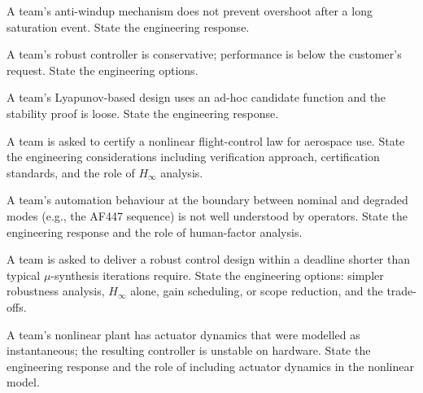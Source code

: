 \begin{exercise}
A team's anti-windup mechanism does not prevent overshoot after a long saturation event. State the engineering response.
\end{exercise}

\begin{exercise}
A team's robust controller is conservative; performance is below the customer's request. State the engineering options.
\end{exercise}

\begin{exercise}
A team's Lyapunov-based design uses an ad-hoc candidate function and the stability proof is loose. State the engineering response.
\end{exercise}

\begin{exercise}
A team is asked to certify a nonlinear flight-control law for aerospace use. State the engineering considerations including verification approach, certification standards, and the role of $H_\infty$ analysis.
\end{exercise}

\begin{exercise}
A team's automation behaviour at the boundary between nominal and degraded modes (e.g., the AF447 sequence) is not well understood by operators. State the engineering response and the role of human-factor analysis.
\end{exercise}

\begin{exercise}
A team is asked to deliver a robust control design within a deadline shorter than typical $\mu$-synthesis iterations require. State the engineering options: simpler robustness analysis, $H_\infty$ alone, gain scheduling, or scope reduction, and the trade-offs.
\end{exercise}

\begin{exercise}
A team's nonlinear plant has actuator dynamics that were modelled as instantaneous; the resulting controller is unstable on hardware. State the engineering response and the role of including actuator dynamics in the nonlinear model.
\end{exercise}
